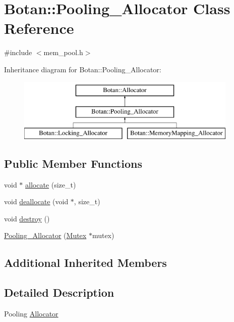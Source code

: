 \hypertarget{classBotan_1_1Pooling__Allocator}{\section{Botan\-:\-:Pooling\-\_\-\-Allocator Class Reference}
\label{classBotan_1_1Pooling__Allocator}
}


{\ttfamily \#include $<$mem\-\_\-pool.\-h$>$}

Inheritance diagram for Botan\-:\-:Pooling\-\_\-\-Allocator\-:\begin{figure}[H]
\begin{center}
\leavevmode
\includegraphics[height=3.000000cm]{classBotan_1_1Pooling__Allocator}
\end{center}
\end{figure}
\subsection*{Public Member Functions}
\begin{DoxyCompactItemize}
\item 
void $\ast$ \hyperlink{classBotan_1_1Pooling__Allocator_a5e82d006bd4a205d576d5e0449bdb7ce}{allocate} (size\-\_\-t)
\item 
void \hyperlink{classBotan_1_1Pooling__Allocator_a9a8c770aa251a9d8a85457e679c8ce41}{deallocate} (void $\ast$, size\-\_\-t)
\item 
void \hyperlink{classBotan_1_1Pooling__Allocator_ad178ef1bbd542a8ec6ae4f9a4b00b020}{destroy} ()
\item 
\hyperlink{classBotan_1_1Pooling__Allocator_a33f3dbd3b6d191cfccdf138fd5e4039c}{Pooling\-\_\-\-Allocator} (\hyperlink{classBotan_1_1Mutex}{Mutex} $\ast$mutex)
\end{DoxyCompactItemize}
\subsection*{Additional Inherited Members}


\subsection{Detailed Description}
Pooling \hyperlink{classBotan_1_1Allocator}{Allocator} 

